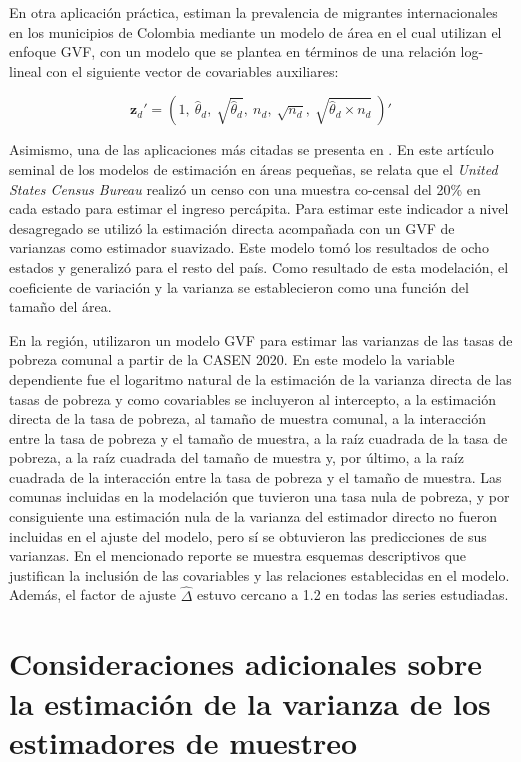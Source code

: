 \documentclass[
  12pt,
]{book}
\begin{document}
En otra aplicación práctica, \citet{Fuquene_Cristancho_Ospina_Morales_2019} estiman la prevalencia de migrantes internacionales en los municipios de Colombia mediante un modelo de área en el cual utilizan el enfoque GVF, con un modelo que se plantea en términos de una relación log-lineal con el siguiente vector de covariables auxiliares:

\[
\mathbf z_d'=\left(1, \
\hat\theta_d, \
\sqrt{\hat\theta_d}, \
n_d, \
\sqrt{n_d}, \
\sqrt{\hat\theta_d \times n_d} \
\right)'
\]

Asimismo, una de las aplicaciones más citadas se presenta en \citet{III_Herriot_1979}. En este artículo seminal de los modelos de estimación en áreas pequeñas, se relata que el \emph{United States Census Bureau} realizó un censo con una muestra co-censal del 20\% en cada estado para estimar el ingreso percápita. Para estimar este indicador a nivel desagregado se utilizó la estimación directa acompañada con un GVF de varianzas como estimador suavizado. Este modelo tomó los resultados de ocho estados y generalizó para el resto del país. Como resultado de esta modelación, el coeficiente de variación y la varianza se establecieron como una función del tamaño del área.

En la región, \citet{MDSF_CEPAL_2021} utilizaron un modelo GVF para estimar las varianzas de las tasas de pobreza comunal a partir de la CASEN 2020. En este modelo la variable dependiente fue el logaritmo natural de la estimación de la varianza directa de las tasas de pobreza y como covariables se incluyeron al intercepto, a la estimación directa de la tasa de pobreza, al tamaño de muestra comunal, a la interacción entre la tasa de pobreza y el tamaño de muestra, a la raíz cuadrada de la tasa de pobreza, a la raíz cuadrada del tamaño de muestra y, por último, a la raíz cuadrada de la interacción entre la tasa de pobreza y el tamaño de muestra. Las comunas incluidas en la modelación que tuvieron una tasa nula de pobreza, y por consiguiente una estimación nula de la varianza del estimador directo no fueron incluidas en el ajuste del modelo, pero sí se obtuvieron las predicciones de sus varianzas. En el mencionado reporte se muestra esquemas descriptivos que justifican la inclusión de las covariables y las relaciones establecidas en el modelo. Además, el factor de ajuste \(\hat\Delta\) estuvo cercano a 1.2 en todas las series estudiadas.

\hypertarget{consideraciones-adicionales-sobre-la-estimaciuxf3n-de-la-varianza-de-los-estimadores-de-muestreo}{%
\section{Consideraciones adicionales sobre la estimación de la varianza de los estimadores de muestreo}\label{consideraciones-adicionales-sobre-la-estimaciuxf3n-de-la-varianza-de-los-estimadores-de-muestreo}}
\end{document}
